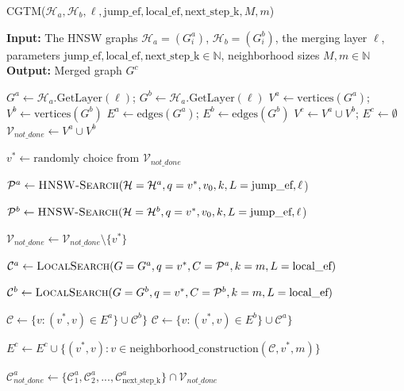 \documentclass{article}
\begin{document}
\begin{algorithm}
    \caption{\textsc{CGTM}($\mathcal{H}_a, \mathcal{H}_b, \ell, \text{jump\_ef}, \text{local\_ef}, \text{next\_step\_k}, M, m$)}\label{alg:CGTM}
    \textbf{Input:} The HNSW graphs $\mathcal{H}_a = (G^a_i)$, $\mathcal{H}_b = (G^b_i)$, the merging layer $\ell$, parameters $\text{jump\_ef}, \text{local\_ef}, \text{next\_step\_k} \in \mathbb{N}$, neighborhood sizes $M, m \in \mathbb{N}$ \\
    \textbf{Output:} Merged graph $G^c$ 
\begin{algorithmic}[1]

\State $G^a \gets \mathcal{H}_a\text{.GetLayer}(\ell) $; $G^b \gets\mathcal{H}_a\text{.GetLayer}(\ell)$ 
\State $V^a \gets \text{vertices}(G^a)$; $V^b \gets \text{vertices}(G^b)$
\State $E^a \gets \text{edges}(G^a)$; $E^b \gets \text{edges}(G^b)$
\State $V^c \gets V^a \cup V^b$; $E^c \gets \emptyset$
\State $\mathcal{V}_{not\_done} \gets V^a \cup V^b$

    \State $v^* \gets \text{randomly choice from } \mathcal{V}_{not\_done}$

    \State $\mathcal{P}^a  \gets \textsc{HNSW-Search}(\mathcal{H}=\mathcal{H}^a, q=v^*, v_0, k, L=\text{jump\_ef}, \ell $)

    \State $\mathcal{P}^b \gets \textsc{HNSW-Search}(\mathcal{H}=\mathcal{H}^b, q=v^*, v_0, k, L=\text{jump\_ef}, \ell $)
    
    
        \State $\mathcal{V}_{not\_done} \gets \mathcal{V}_{not\_done} \setminus \{v^*\}$
        

        \State $ \mathcal{C}^a  \gets \textsc{LocalSearch}(G=G^a, q=v^*, C=\mathcal{P}^a  , k=m, L=\text{local\_ef})$
        
        \State $\mathcal{C}^b \gets \textsc{LocalSearch}(G=G^b, q=v^*, C=\mathcal{P}^b , k=m, L=\text{local\_ef})$
        
            \State $\mathcal{C}\gets  \{v : (v^*, v) \in E^a \} \cup  \mathcal{C}^b\}$
        \Else
            \State $\mathcal{C} \gets  \{v : (v^*, v) \in E^b \} \cup  \mathcal{C}^a\}$
        \EndIf
        
        \State $E^c \gets E^c \cup \{ (v^*, v) : v \in \text{neighborhood\_construction}(\mathcal{C}, v^*, m) \}$
        
        \State $\mathcal{C}^a_{not\_done} \gets \{\mathcal{C}^a_1, \mathcal{C}^a_2, ..., \mathcal{C}^a_{ \text{next\_step\_k} } \} \cap \mathcal{V}_{not\_done}$


\end{algorithmic}
\end{algorithm}
\end{document}
